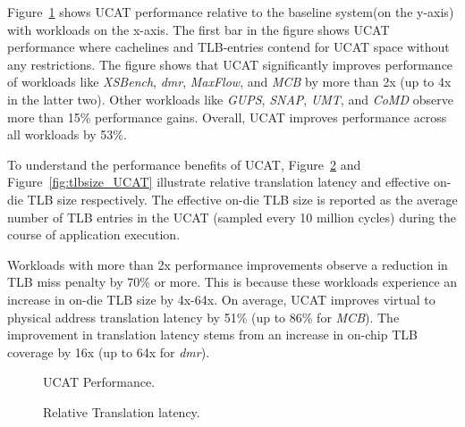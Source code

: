 
\noindent Figure~\ref{fig:perf_UCAT} shows UCAT performance relative
to the baseline system(on the y-axis) with workloads on the x-axis.
The first bar in the figure shows UCAT performance where cachelines
and TLB-entries contend for UCAT space without any restrictions. The
figure shows that UCAT significantly improves performance of workloads
like {\em XSBench}, {\em dmr}, {\em MaxFlow}, and {\em MCB} by more
than 2x (up to 4x in the latter two). Other workloads like {\em GUPS},
{\em SNAP}, {\em UMT}, and {\em CoMD} observe more than 15\%
performance gains. Overall, UCAT improves performance across all
workloads by 53\%.

To understand the performance benefits of UCAT,
Figure~\ref{fig:tlblat_UCAT} and Figure~\ref{fig:tlbsize_UCAT}
illustrate relative translation latency and effective on-die TLB size
respectively. The effective on-die TLB size is reported as the average
number of TLB entries in the UCAT (sampled every 10 million cycles)
during the course of application execution.

Workloads with more than 2x performance improvements observe a
reduction in TLB miss penalty by 70\% or more. This is because these
workloads experience an increase in on-die TLB size by 4x-64x. On
average, UCAT improves virtual to physical address translation latency
by 51\% (up to 86\% for {\em MCB}). The improvement in translation
latency stems from an increase in on-chip TLB coverage by 16x (up to
64x for {\em dmr}).

\begin{figure}[tp] 
  \vspace{-0.in} \centering
  \centerline{}

  \caption{\small UCAT Performance. \normalsize}
  \label{fig:perf_UCAT} 
  \vspace{0.1 in}
\end{figure}

\begin{figure}[tp] 
  \vspace{0.1in} \centering
  \centerline{}

  \caption{\small Relative Translation latency.\normalsize}
  \label{fig:tlblat_UCAT} 
  \vspace{-0.0 in}
\end{figure}

